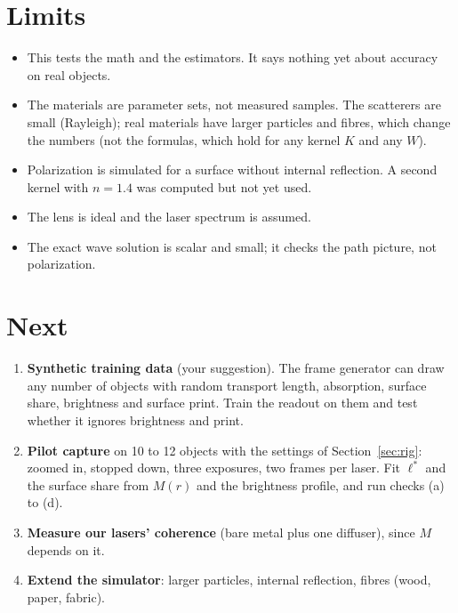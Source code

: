 \documentclass[11pt]{article}
\begin{document}
\section{Limits}
\begin{itemize}
\item This tests the math and the estimators. It says nothing yet about accuracy on real objects.
\item The materials are parameter sets, not measured samples. The scatterers are small (Rayleigh); real materials
  have larger particles and fibres, which change the numbers (not the formulas, which hold for any kernel $K$ and any
  $W$).
\item Polarization is simulated for a surface without internal reflection. A second kernel with $n=1.4$ was computed
  but not yet used.
\item The lens is ideal and the laser spectrum is assumed.
\item The exact wave solution is scalar and small; it checks the path picture, not polarization.
\end{itemize}

\section{Next}\label{sec:next}
\begin{enumerate}
\item \textbf{Synthetic training data} (your suggestion). The frame generator can draw any number of objects with
  random transport length, absorption, surface share, brightness and surface print. Train the readout on them and test
  whether it ignores brightness and print.
\item \textbf{Pilot capture} on 10 to 12 objects with the settings of Section~\ref{sec:rig}: zoomed in, stopped down,
  three exposures, two frames per laser. Fit $\ell^*$ and the surface share from $M(r)$ and the brightness profile,
  and run checks (a) to (d).
\item \textbf{Measure our lasers' coherence} (bare metal plus one diffuser), since $M$ depends on it.
\item \textbf{Extend the simulator}: larger particles, internal reflection, fibres (wood, paper, fabric).
\end{enumerate}
\end{document}
